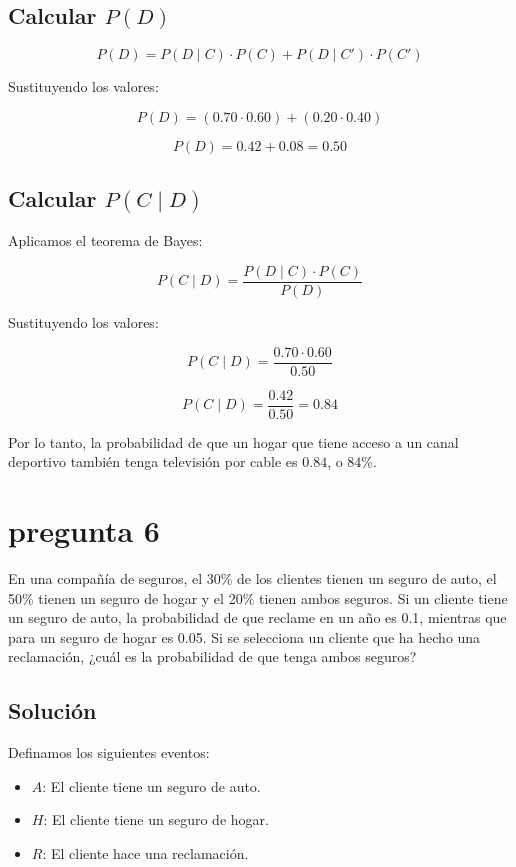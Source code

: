 \documentclass[12pt,a4paper]{article}
\begin{document}
\subsection*{ Calcular \( P(D) \)}

\[
P(D) = P(D \mid C) \cdot P(C) + P(D \mid C') \cdot P(C')
\]

Sustituyendo los valores:

\[
P(D) = (0.70 \cdot 0.60) + (0.20 \cdot 0.40)
\]

\[
P(D) = 0.42 + 0.08 = 0.50
\]

\subsection*{ Calcular \( P(C \mid D) \)}

Aplicamos el teorema de Bayes:

\[
P(C \mid D) = \frac{P(D \mid C) \cdot P(C)}{P(D)}
\]

Sustituyendo los valores:

\[
P(C \mid D) = \frac{0.70 \cdot 0.60}{0.50}
\]

\[
P(C \mid D) = \frac{0.42}{0.50} = 0.84
\]

Por lo tanto, la probabilidad de que un hogar que tiene acceso a un canal deportivo también tenga televisión por cable es \( 0.84 \), o \( 84\% \).
\section*{pregunta 6}

En una compañía de seguros, el 30\% de los clientes tienen un seguro de auto, el 50\% tienen un seguro de hogar y el 20\% tienen ambos seguros. Si un cliente tiene un seguro de auto, la probabilidad de que reclame en un año es 0.1, mientras que para un seguro de hogar es 0.05. Si se selecciona un cliente que ha hecho una reclamación, ¿cuál es la probabilidad de que tenga ambos seguros?

\subsection*{Solución}

Definamos los siguientes eventos:
\begin{itemize}
    \item \( A \): El cliente tiene un seguro de auto.
    \item \( H \): El cliente tiene un seguro de hogar.
    \item \( R \): El cliente hace una reclamación.
\end{itemize}
\end{document}
